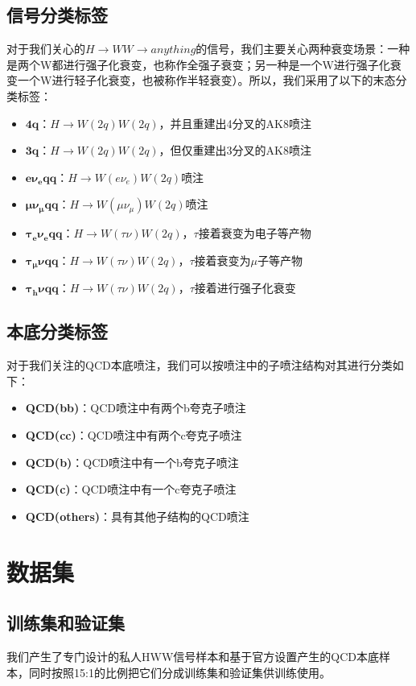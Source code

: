 \subsection{信号分类标签}
对于我们关心的$H\to WW\to anything$的信号，我们主要关心两种衰变场景：一种是两个W都进行强子化衰变，也称作全强子衰变；另一种是一个W进行强子化衰变一个W进行轻子化衰变，也被称作半轻衰变）。所以，我们采用了以下的末态分类标签：
\begin{itemize}
    \item $\mathbf{4q}$：$H\to W(2q)W(2q)$，并且重建出4分叉的AK8喷注
    \item $\mathbf{3q}$：$H\to W(2q)W(2q)$，但仅重建出3分叉的AK8喷注
    \item $\mathbf{e\nu_e qq}$：$H\to W(e\nu_e)W(2q)$喷注
    \item $\mathbf{\mu\nu_\mu qq}$：$H\to W(\mu\nu_\mu)W(2q)$喷注
    \item $\mathbf{\tau_e\nu_eqq}$：$H\to W(\tau\nu)W(2q)$，$\tau$接着衰变为电子等产物
    \item $\mathbf{\tau_\mu\nu qq}$：$H\to W(\tau\nu)W(2q)$，$\tau$接着衰变为$\mu$子等产物
    \item $\mathbf{\tau_h\nu qq}$：$H\to W(\tau\nu)W(2q)$，$\tau$接着进行强子化衰变
\end{itemize}
\subsection{本底分类标签}
对于我们关注的QCD本底喷注，我们可以按喷注中的子喷注结构对其进行分类如下：
\begin{itemize}\label{eq:5.2}
    \item \textbf{QCD(bb)}：QCD喷注中有两个b夸克子喷注
    \item \textbf{QCD(cc)}：QCD喷注中有两个c夸克子喷注
    \item \textbf{QCD(b)}：QCD喷注中有一个b夸克子喷注
    \item \textbf{QCD(c)}：QCD喷注中有一个c夸克子喷注
    \item \textbf{QCD(others)}：具有其他子结构的QCD喷注
\end{itemize}
\section{数据集}
\subsection{训练集和验证集}
我们产生了专门设计的私人HWW信号样本和基于官方设置产生的QCD本底样本，同时按照15:1的比例把它们分成训练集和验证集供训练使用。
